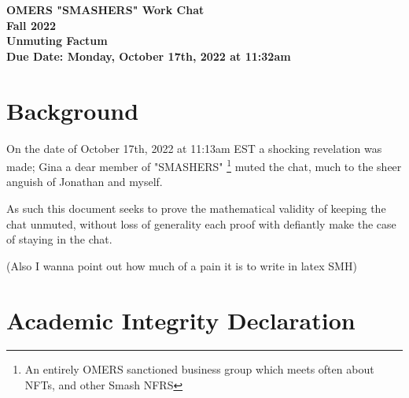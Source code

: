 \documentclass[12pt]{article}
\begin{document}
\begin{center}
{\Large\textbf{OMERS "SMASHERS" Work Chat}}\\
\vspace{3mm}
{\Large\textbf{Fall 2022}}\\
\vspace{2mm}
{\Large\textbf{Unmuting Factum}}\\
\vspace{3mm}
\textbf{Due Date: Monday, October 17th, 2022 at 11:32am}
\end{center}

\section*{Background}

On the date of October 17th, 2022 at 11:13am EST a shocking revelation was made; Gina a dear member of "SMASHERS"
\footnote{%
	An entirely OMERS sanctioned business group which meets often about NFTs, and other Smash NFRS%
} 
muted the chat, much to the sheer anguish of Jonathan and myself.


As such this document seeks to prove the mathematical validity of keeping the chat unmuted, without loss of generality each proof with defiantly make the case of staying in the chat.
\vspace{15mm}
\begin{center}
(Also I wanna point out how much of a pain it is to write in latex SMH)
\end{center}

\clearpage

\addtocounter{section}{-1}
\section{Academic Integrity Declaration}
\end{document}
